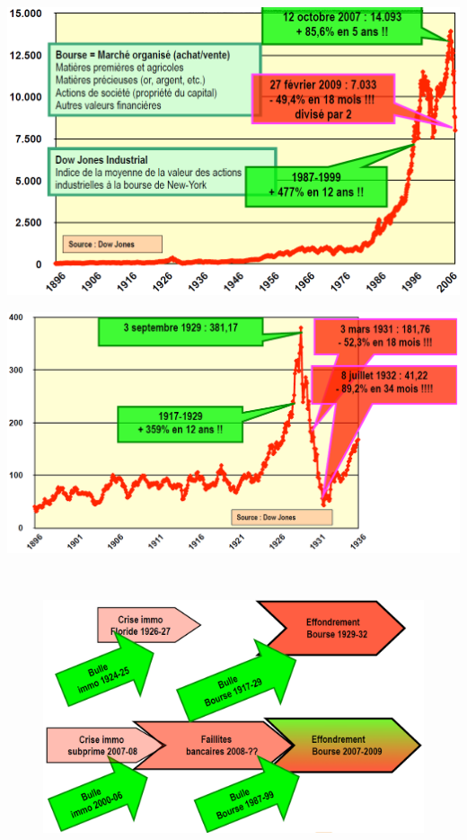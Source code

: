 \begin{minipage}{0.5\textwidth}
	\begin{flushleft}
		\includegraphics[scale=0.26]{44}
	\end{flushleft}
\end{minipage}
\begin{minipage}{0.5\textwidth}
	\begin{center}
		\includegraphics[scale=0.29]{45}
	\end{center}
\end{minipage}
\\
\begin{figure}
	\includegraphics[scale=0.3]{46}
\end{figure}
